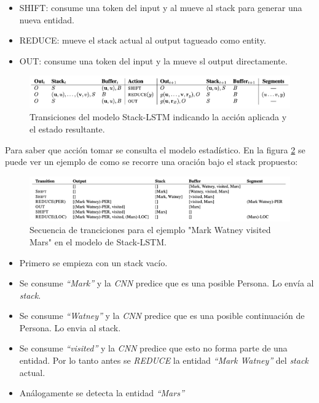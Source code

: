 \documentclass[12pt,a4paper,]{scrartcl}
\providecommand{\tightlist}{%
  \setlength{\itemsep}{0pt}\setlength{\parskip}{0pt}}
\begin{document}
\begin{itemize}
\tightlist
\item
  SHIFT: consume una token del input y al mueve al stack para generar una nueva entidad.
\item
  REDUCE: mueve el stack actual al output tagueado como entity.
\item
  OUT: consume una token del input y la mueve sl output directamente.
\end{itemize}

\begin{figure}[H]

{\centering \includegraphics{assets/lampe_1.pdf} 

}

\caption{Transiciones del modelo Stack-LSTM indicando la acción aplicada y el estado resultante.}\label{fig:lampe-1}
\end{figure}

Para saber que acción tomar se consulta el modelo estadístico. En la figura \ref{fig:lampe-2} se puede ver un ejemplo de como se recorre una oración bajo el stack propuesto:

\begin{figure}[H]

{\centering \includegraphics{assets/lampe_2.pdf} 

}

\caption{Secuencia de tranciciones para el ejemplo "Mark Watney visited Mars" en el modelo de Stack-LSTM.}\label{fig:lampe-2}
\end{figure}

\begin{itemize}
\tightlist
\item
  Primero se empieza con un stack vacío.
\item
  Se consume \emph{\enquote{Mark}} y la \emph{CNN} predice que es una posible Persona. Lo envía al \emph{stack}.
\item
  Se consume \emph{\enquote{Watney}} y la \emph{CNN} predice que es una posible continuación de Persona. Lo envia al stack.
\item
  Se consume \emph{\enquote{visited}} y la \emph{CNN} predice que esto no forma parte de una entidad. Por lo tanto antes se \emph{REDUCE} la entidad \emph{\enquote{Mark Watney}} del \emph{stack} actual.
\item
  Análogamente se detecta la entidad \emph{\enquote{Mars}}
\end{itemize}
\end{document}
